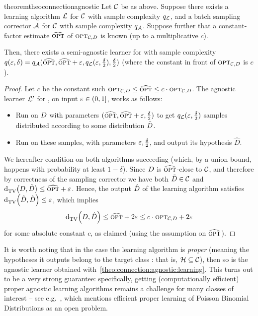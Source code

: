 \begin{restatable}{theorem}{theoconnectionagnostic}\label{theo:connection:agnostic:learning}
Let $\mathcal{C}$ be as above. Suppose there exists a learning algorithm $\mathcal{L}$ for $\mathcal{C}$ with sample complexity $q_\mathcal{L}$, and a batch sampling corrector $\mathcal{A}$ for $\mathcal{C}$ with sample complexity $q_\mathcal{A}$. Suppose further that a constant-factor estimate $\widehat{{\textsc{opt}}}$ of ${\textsc{opt}}_{\mathcal{C}, D}$ is known (up to a multiplicative $c$).

Then, there exists a {semi-}agnostic learner for \class with sample complexity $q(\varepsilon,\delta)=q_\mathcal{A}(\widehat{{\textsc{opt}}},\widehat{{\textsc{opt}}}+\varepsilon, q_\mathcal{L}(\varepsilon,\frac{\delta}{2}),\frac{\delta}{2})$ (where the constant in front of ${\textsc{opt}}_{\mathcal{C}, D}$ is $c$).
\end{restatable}
\begin{proof}
Let $c$ be the constant such ${\textsc{opt}}_{\mathcal{C},D} \leq \widehat{{\textsc{opt}}}\leq c\cdot{\textsc{opt}}_{\mathcal{C},D}$. The agnostic learner $\mathcal{L}^\prime$ for \property, on input $\varepsilon\in(0,1]$, works as follows:
\begin{itemize}[-]
  \item\label{theo:connection:agnostic:learning:step:1} Run \Algo on $D$ with parameters $(\widehat{{\textsc{opt}}}, \widehat{{\textsc{opt}}}+\varepsilon,\frac{\delta}{2})$ to get $q_\mathcal{L}(\varepsilon,\frac{\delta}{2})$ samples distributed according to some distribution $\tilde{D}$.
  \item Run \Learner on these samples, with parameters $\varepsilon,\frac{\delta}{2}$, and output its hypothesis $\hat{D}$.
\end{itemize}
We hereafter condition on both algorithms succeeding (which, by a union bound, happens with probability at least $1-\delta$). Since $D$  is $\widehat{{\textsc{opt}}}$-close to $\mathcal{C}$, and therefore by correctness of the sampling corrector we have both $\tilde{D}\in\mathcal{C}$ and ${\operatorname{d}_{\textrm{TV}}^{}\!\left({D, \tilde{D}}\right)} \leq \widehat{{\textsc{opt}}}+\varepsilon$. Hence, the output $\hat{D}$ of the learning algorithm satisfies ${\operatorname{d}_{\textrm{TV}}^{}\!\left({\tilde{D}, \hat{D}}\right)} \leq \varepsilon$, which implies
\begin{equation}
	{\operatorname{d}_{\textrm{TV}}^{}\!\left({\ensuremath{D}, \hat{\ensuremath{D}}}\right)} \leq \widehat{{\textsc{opt}}} + 2\varepsilon \leq c\cdot{\textsc{opt}}_{\mathcal{C},D} + 2\varepsilon \label{eq:connection:agnostic:learning}
\end{equation}
for some absolute constant $c$, as claimed (using the assumption on $\widehat{{\textsc{opt}}}$).
\end{proof}

It is worth noting that in the case the learning algorithm is \emph{proper} (meaning the hypotheses it outputs belong to the target class \class: that is, $\mathcal{H}\subseteq\mathcal{C}$), then so is the agnostic learner obtained with~\autoref{theo:connection:agnostic:learning}. This turns out to be a very strong guarantee: specifically, getting (computationally efficient) proper agnostic learning algorithms remains a challenge for many classes of interest -- see e.g.~\cite{DDS:PBD:12}, which mentions efficient proper learning of Poisson Binomial Distributions as an open problem.

